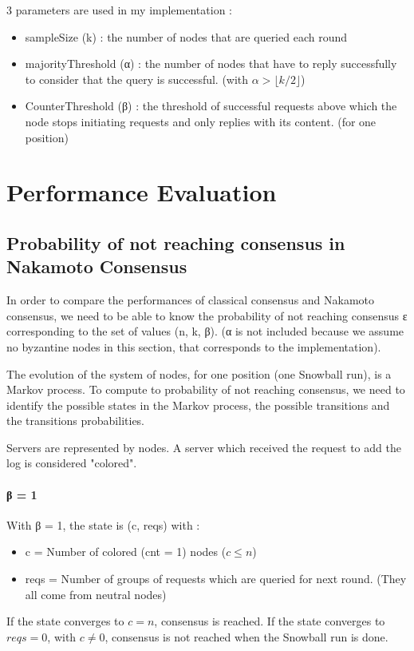 \documentclass[11pt, twocolumn]{article}
\begin{document}
3 parameters are used in my implementation :
\begin{itemize}
    \item sampleSize (k) : the number of nodes that are queried each round
    \item majorityThreshold (α) : the number of nodes that have to reply successfully to consider that the query is successful.
          (with $\alpha > \lfloor k/2 \rfloor$)
    \item CounterThreshold (β) : the threshold of successful requests above which the node stops initiating requests and only replies with its content. (for one position)
\end{itemize}

\section{Performance Evaluation}
\subsection{Probability of not reaching consensus in Nakamoto Consensus}

In order to compare the performances of classical consensus and Nakamoto consensus, we need to be able to know the probability of not reaching consensus ε corresponding to the set
of values (n, k, β). (α is not included because we assume no byzantine nodes in this section, that corresponds to the implementation).

The evolution of the system of nodes, for one position (one Snowball run), is a Markov process. To compute to probability of not reaching consensus, we need to identify the possible states in the
Markov process, the possible transitions and the transitions probabilities.

Servers are represented by nodes. A server which received the request to add the log is considered "colored". 

\paragraph{β = 1}
With β = 1, the state is (c, reqs) with :
\begin{itemize}
    \item c = Number of colored (cnt = 1) nodes ($c \leq n$)
    \item reqs = Number of groups of requests which are queried for next round. (They all come from neutral nodes)
\end{itemize}
If the state converges to $c = n$, consensus is reached.
If the state converges to $reqs = 0$, with $c \neq 0$, consensus is not reached when the Snowball run is done.
\end{document}
